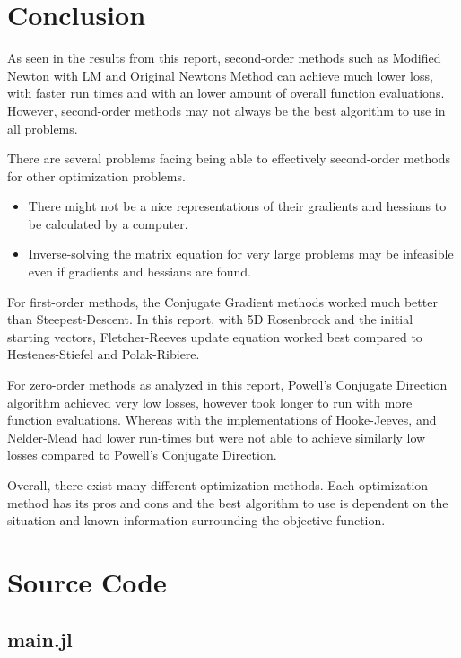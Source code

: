 \documentclass{article}
\begin{document}
    \section{Conclusion}

    As seen in the results from this report, second-order methods such as Modified Newton with LM and Original Newtons Method can achieve much lower loss, with faster run times and with an lower amount of overall function evaluations. However, second-order methods may not always be the best algorithm to use in all problems. 
    
    There are several problems facing being able to effectively second-order methods for other optimization problems.
    \begin{itemize}
        \item There might not be a nice representations of their gradients and hessians to be calculated by a computer. 
        \item Inverse-solving the matrix equation for very large problems may be infeasible even if gradients and hessians are found.
    \end{itemize}

    For first-order methods, the Conjugate Gradient methods worked much better than Steepest-Descent. In this report, with 5D Rosenbrock and the initial starting vectors, Fletcher-Reeves update equation worked best compared to Hestenes-Stiefel and Polak-Ribiere.

    For zero-order methods as analyzed in this report, Powell's Conjugate Direction algorithm achieved very low losses, however took longer to run with more function evaluations. Whereas with the implementations of Hooke-Jeeves, and Nelder-Mead had lower run-times but were not able to achieve similarly low losses compared to Powell's Conjugate Direction.

    Overall, there exist many different optimization methods. Each optimization method has its pros and cons and the best algorithm to use is dependent on the situation and known information surrounding the objective function.

    \newpage
    \appendix

    \section{Source Code}

    \subsection{main.jl}
    
\end{document}
